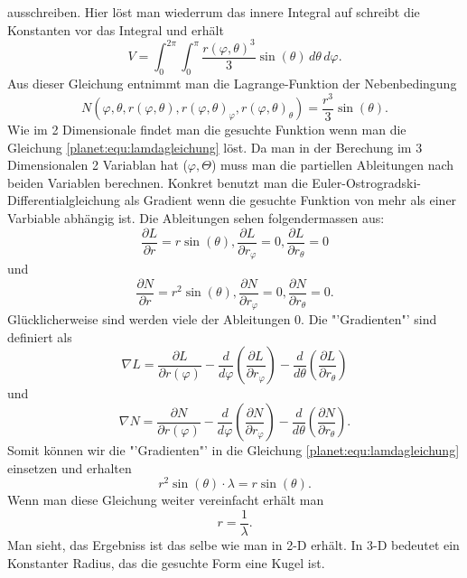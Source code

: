 ausschreiben.
Hier löst man wiederrum das innere Integral auf schreibt die Konstanten vor das Integral und erhält
\begin{equation*}
	V = \int_{0}^{2\pi}\int_{0}^{\pi}\frac{r(\varphi,\theta)^3}{3} \sin (\theta) \, d\theta \, d\varphi.
\end{equation*}
Aus dieser Gleichung entnimmt man die Lagrange-Funktion der Nebenbedingung
\begin{equation*}
	N(\varphi,\theta ,r(\varphi,\theta),r(\varphi,\theta)_\varphi,r(\varphi,\theta)_\theta) = \frac{r^3}{3} \sin (\theta).
\end{equation*}
Wie im 2 Dimensionale findet man die gesuchte Funktion wenn man die Gleichung \eqref{planet:equ:lamdagleichung} löst.
Da man in der Berechung im 3 Dimensionalen 2 Variablan hat (\(\varphi,\Theta\)) muss man die partiellen Ableitungen nach beiden Variablen berechnen.
Konkret benutzt man die Euler-Ostrogradski-Differentialgleichung als Gradient wenn die gesuchte Funktion von mehr als einer Varbiable abhängig ist.
Die Ableitungen sehen folgendermassen aus:
\begin{equation*}
	\frac{\partial L}{\partial r} = r  \sin (\theta) ,
	\frac{\partial L}{\partial r_\varphi} = 0 ,
	\frac{\partial L}{\partial r_\theta} = 0
\end{equation*}
und
\begin{equation*}
	\frac{\partial N}{\partial r} = r^2\sin (\theta) ,
	\frac{\partial N}{\partial r_\varphi} = 0 ,
	\frac{\partial N}{\partial r_\theta} = 0.
\end{equation*}
Glücklicherweise sind werden viele der Ableitungen 0.
Die "'Gradienten"' sind definiert als
\begin{equation*}
	\nabla L =  \frac{\partial L}{\partial r(\varphi)} 
	-\frac{d}{d\varphi}\left( \frac{\partial L}{\partial r_\varphi} \right)
	-\frac{d}{d\theta}\left( \frac{\partial L}{\partial r_\theta} \right)
\end{equation*}
und
\begin{equation*}
	\nabla N=  \frac{\partial N}{\partial r(\varphi)} 
	-\frac{d}{d\varphi}\left( \frac{\partial N}{\partial r_\varphi} \right)
	-\frac{d}{d\theta}\left( \frac{\partial N}{\partial r_\theta} \right).
\end{equation*}
Somit können wir die "'Gradienten"' in die Gleichung \eqref{planet:equ:lamdagleichung} einsetzen und erhalten
\begin{equation*}
	r^2\sin (\theta) \cdot \lambda = r \sin (\theta).
\end{equation*}
Wenn man diese Gleichung weiter vereinfacht erhält man
\begin{equation*}
	r = \frac{1}{\lambda}.
\end{equation*}
Man sieht, das Ergebniss ist das selbe wie man in 2-D erhält.
In 3-D bedeutet ein Konstanter Radius, das die gesuchte Form eine Kugel ist.

